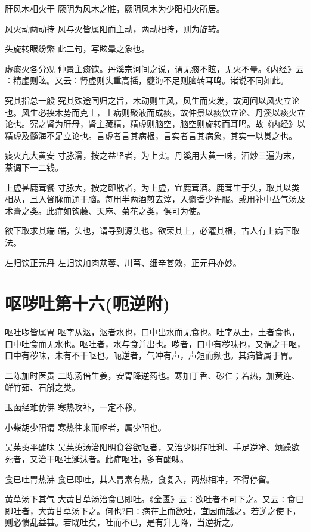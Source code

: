 \documentclass[a4paper,12pt,UTF8,twoside]{ctexbook}
\begin{document}
    肝风木相火干
    厥阴为风木之脏，厥阴风木为少阳相火所居。
    
    风火动两动抟
    风与火皆属阳而主动，两动相抟，则为旋转。
    
    头旋转眼纷繁
    此二句，写眩晕之象也。
    
    虚痰火各分观
    仲景主痰饮。丹溪宗河间之说，谓无痰不眩，无火不晕。《内经》云∶精虚则眩。又云∶肾虚则头重高摇，髓海不足则脑转耳鸣。诸说不同如此。
    
    究其指总一般
    究其殊途同归之旨，木动则生风，风生而火发，故河间以风火立论也。风生必挟木势而克土，土病则聚液而成痰，故仲景以痰饮立论、丹溪以痰火立论也。究之肾为肝母，肾主藏精，精虚则脑空，脑空则旋转而耳鸣。故《内经》以精虚及髓海不足立论也。言虚者言其病根，言实者言其病象，其实一以贯之也。
    
    痰火亢大黄安
    寸脉滑，按之益坚者，为上实。丹溪用大黄一味，酒炒三遍为末，茶调下一二钱。
    
    上虚甚鹿茸餐
    寸脉大，按之即散者，为上虚，宜鹿茸酒。鹿茸生于头，取其以类相从，且入督脉而通于脑。每用半两酒煎去滓，入麝香少许服。或用补中益气汤及术膏之类。此症如钩藤、天麻、菊花之类，俱可为使。
    
    欲下取求其端
    端，头也，谓寻到源头也。欲荣其上，必灌其根，古人有上病下取法。
    
    左归饮正元丹
    左归饮加肉苁蓉、川芎、细辛甚效，正元丹亦妙。
    
    
    
    \section{呕哕吐第十六(呃逆附)}
    呕吐哕皆属胃
    呕字从沤，沤者水也，口中出水而无食也。吐字从土，土者食也，口中吐食而无水也。呕吐者，水与食并出也。哕者，口中有秽味也，又谓之干呕，口中有秽味，未有不干呕也。呃逆者，气冲有声，声短而频也。其病皆属于胃。
    
    二陈加时医贵
    二陈汤倍生姜，安胃降逆药也。寒加丁香、砂仁；若热，加黄连、鲜竹茹、石斛之类。
    
    玉函经难仿佛
    寒热攻补，一定不移。
    
    小柴胡少阳谓
    寒热往来而呕者，属少阳也。
    
    吴茱萸平酸味
    吴茱萸汤治阳明食谷欲呕者，又治少阴症吐利、手足逆冷、烦躁欲死者，又治干呕吐涎沫者。此症呕吐，多有酸味。
    
    食已吐胃热沸
    食已即吐，其人胃素有热，食复入，两热相冲，不得停留。
    
    黄草汤下其气
    大黄甘草汤治食已即吐。《金匮》云∶欲吐者不可下之。又云∶食已即吐者，大黄甘草汤下之。何也?曰∶病在上而欲吐，宜因而越之。若逆之使下，则必愦乱益甚。若既吐矣，吐而不已，是有升无降，当逆折之。
    
\end{document}
